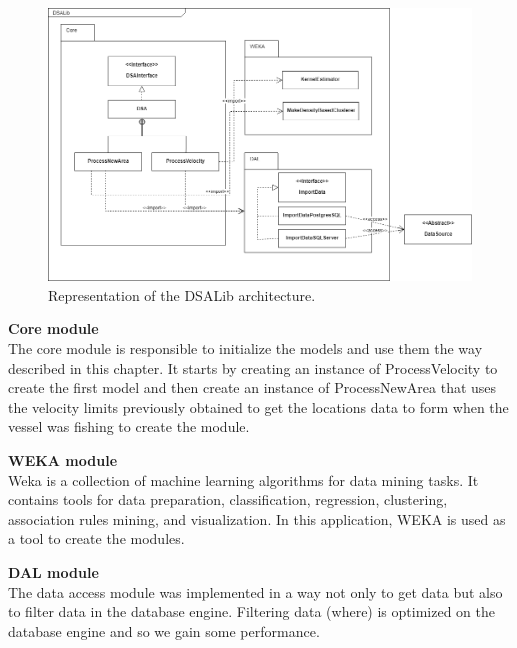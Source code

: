 \begin{figure}[h]
    \centering
    \includegraphics[width=1.0\linewidth]{Chapters/img/DSALib_Prof.png}
    \caption{Representation of the DSALib architecture.}
    \label{fig:DSALib_Prof}
\end{figure}



\textbf{Core module} \\The core module is responsible to initialize the models and use them the way described in this chapter. It starts by creating an instance of ProcessVelocity to create the first model and then create an instance of ProcessNewArea that uses the velocity limits previously obtained to get the locations data to form when the vessel was fishing to create the module.

\textbf{WEKA module} \\Weka is a collection of machine learning algorithms for data mining tasks. It contains tools for data preparation, classification, regression, clustering, association rules mining, and visualization. In this application, WEKA is used as a tool to create the modules.

\textbf{DAL module} \\The data access module was implemented in a way not only to get data but also to filter data in the database engine. Filtering data (where) is optimized on the database engine and so we gain some performance.




